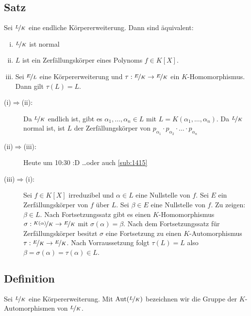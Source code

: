 \subsection[\protect{Satz über äquivalente Aussagen zu $\nicefrac{L}{K}$ ist normal}]{Satz} %
\label{sub:154}
Sei $\nicefrac{L}{K}$ eine endliche Körpererweiterung. Dann sind äquivalent:
\begin{enumerate}[(i)]
	\item $\nicefrac{L}{K}$ ist normal
	\item $L$ ist ein Zerfällungskörper eines Polynoms $f \in K[X]$. 
	\item Sei $\nicefrac{E}{L}$ eine Körpererweiterung und $\tau : \nicefrac{E}{K} \to \nicefrac{E}{K}$ ein $K$-Homomorphismus. Dann gilt $\tau(L)=L$.
\end{enumerate}
\begin{description}
	\item[(i)$\Rightarrow $(ii):] Da $\nicefrac{L}{K}$ endlich ist, gibt es $\alpha_1, \ldots , \alpha_n \in L$ mit $L=K(\alpha_1, \ldots ,\alpha_n)$. Da 
	$\nicefrac{L}{K}$ normal ist, ist $L$ der Zerfällungskörper von $p_{\alpha_1} \cdot p_{\alpha_2} \cdot \ldots \cdot p_{\alpha_n}$
	\item[(ii)$\Rightarrow $(iii):] Heute um 10:30 :D \ldots  oder auch \ref{sub:1415}
	\item[(iii)$\Rightarrow $(i):] Sei $f \in K[X]$ irreduzibel und $\alpha \in L$ eine Nullstelle von $f$. Sei $E$ ein Zerfällungskörper von $f$ über $L$. Sei 
	$\beta \in E$ eine Nullstelle von $f$. Zu zeigen: $\beta \in L$. Nach Fortsetzungssatz gibt es einen $K$-Homomorphismus $\sigma : \nicefrac{K(\alpha)}{K} \to \nicefrac{E}{K}$ mit $\sigma(\alpha)=\beta$. Nach dem Fortsetzungssatz für Zerfällungskörper besitzt $\sigma$ eine Fortsetzung zu einen $K$-Automorphismus
	$\tau : \nicefrac{E}{K} \to \nicefrac{E}{K}$. Nach Vorraussetzung folgt $\tau(L)=L$ also $\beta= \sigma(\alpha) =\tau (\alpha) \in L$. \bewende
\end{description}

\subsection[Definition: Gruppe der $K$-Automorphismen]{Definition} %
\label{sub:155}
Sei $\nicefrac{L}{K}$ eine Körpererweiterung. Mit $\operatorname{Aut}(\nicefrac{L}{K})$
 bezeichnen wir die Gruppe der $K$-Automorphismen von $\nicefrac{L}{K}$.

